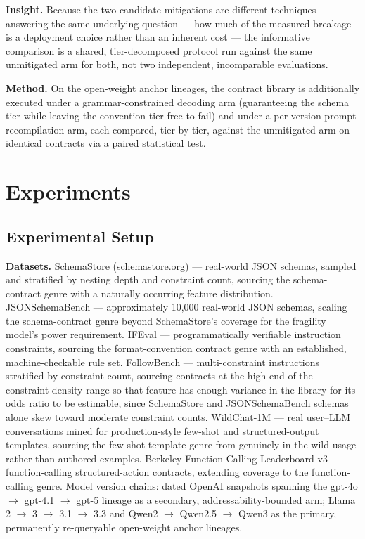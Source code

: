 \documentclass[11pt]{article}
\begin{document}
\textbf{Insight.} Because the two candidate mitigations are different techniques answering the same underlying question --- how much of the measured breakage is a deployment choice rather than an inherent cost --- the informative comparison is a shared, tier-decomposed protocol run against the same unmitigated arm for both, not two independent, incomparable evaluations.

\textbf{Method.} On the open-weight anchor lineages, the contract library is additionally executed under a grammar-constrained decoding arm (guaranteeing the schema tier while leaving the convention tier free to fail) and under a per-version prompt-recompilation arm, each compared, tier by tier, against the unmitigated arm on identical contracts via a paired statistical test.

\section{Experiments}

\subsection{Experimental Setup}

\textbf{Datasets.} SchemaStore (schemastore.org) --- real-world JSON schemas, sampled and stratified by nesting depth and constraint count, sourcing the schema-contract genre with a naturally occurring feature distribution. JSONSchemaBench --- approximately 10{,}000 real-world JSON schemas, scaling the schema-contract genre beyond SchemaStore's coverage for the fragility model's power requirement. IFEval --- programmatically verifiable instruction constraints, sourcing the format-convention contract genre with an established, machine-checkable rule set. FollowBench --- multi-constraint instructions stratified by constraint count, sourcing contracts at the high end of the constraint-density range so that feature has enough variance in the library for its odds ratio to be estimable, since SchemaStore and JSONSchemaBench schemas alone skew toward moderate constraint counts. WildChat-1M --- real user--LLM conversations mined for production-style few-shot and structured-output templates, sourcing the few-shot-template genre from genuinely in-the-wild usage rather than authored examples. Berkeley Function Calling Leaderboard v3 --- function-calling structured-action contracts, extending coverage to the function-calling genre. Model version chains: dated OpenAI snapshots spanning the gpt-4o $\to$ gpt-4.1 $\to$ gpt-5 lineage as a secondary, addressability-bounded arm; Llama 2 $\to$ 3 $\to$ 3.1 $\to$ 3.3 and Qwen2 $\to$ Qwen2.5 $\to$ Qwen3 as the primary, permanently re-queryable open-weight anchor lineages.
\end{document}
